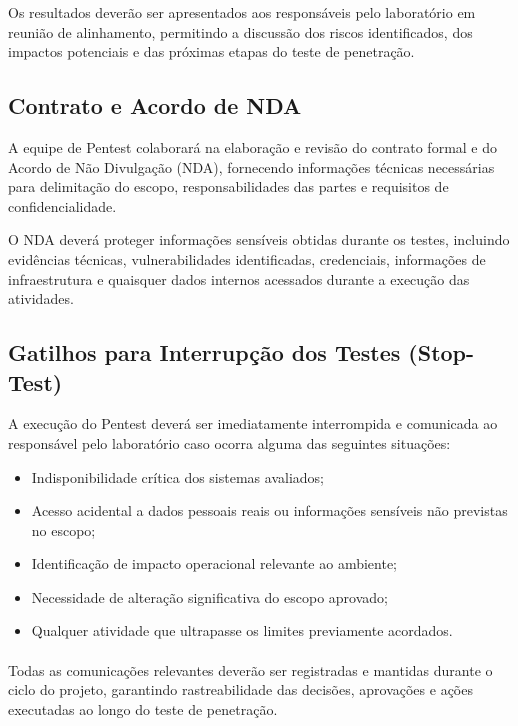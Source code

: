 Os resultados deverão ser apresentados aos responsáveis pelo laboratório em
reunião de alinhamento, permitindo a discussão dos riscos identificados, dos
impactos potenciais e das próximas etapas do teste de penetração.

\subsection{Contrato e Acordo de NDA}

A equipe de Pentest colaborará na elaboração e revisão do contrato formal e do
Acordo de Não Divulgação (NDA), fornecendo informações técnicas necessárias
para delimitação do escopo, responsabilidades das partes e requisitos de
confidencialidade.

O NDA deverá proteger informações sensíveis obtidas durante os testes,
incluindo evidências técnicas, vulnerabilidades identificadas, credenciais,
informações de infraestrutura e quaisquer dados internos acessados durante a
execução das atividades.

\subsection{Gatilhos para Interrupção dos Testes (Stop-Test)}

A execução do Pentest deverá ser imediatamente interrompida e comunicada ao
responsável pelo laboratório caso ocorra alguma das seguintes situações:

\begin{itemize}
\item Indisponibilidade crítica dos sistemas avaliados;
\item Acesso acidental a dados pessoais reais ou informações sensíveis não
previstas no escopo;
\item Identificação de impacto operacional relevante ao ambiente;
\item Necessidade de alteração significativa do escopo aprovado;
\item Qualquer atividade que ultrapasse os limites previamente acordados.
\end{itemize}

\paragraph{}
Todas as comunicações relevantes deverão ser registradas e mantidas durante o
ciclo do projeto, garantindo rastreabilidade das decisões, aprovações e ações
executadas ao longo do teste de penetração.
